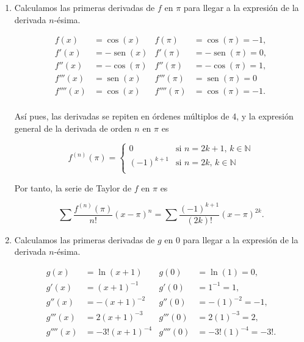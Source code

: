 \documentclass[
  spanish,
  a4paper,
]{scrreport}
\theoremstyle{definition}
\theoremstyle{remark}
\begin{document}
\begin{tcolorbox}[enhanced jigsaw, arc=.35mm, bottomrule=.15mm, bottomtitle=1mm, breakable, colback=white, colbacktitle=quarto-callout-tip-color!10!white, colframe=quarto-callout-tip-color-frame, coltitle=black, left=2mm, leftrule=.75mm, opacityback=0, opacitybacktitle=0.6, rightrule=.15mm, title=\textcolor{quarto-callout-tip-color}{\faLightbulb}\hspace{0.5em}{Solución}, titlerule=0mm, toprule=.15mm, toptitle=1mm]

\begin{enumerate}
\def\labelenumi{\alph{enumi}.}
\item
  Calculamos las primeras derivadas de \(f\) en \(\pi\) para llegar a la
  expresión de la derivada \(n\)-ésima.

  \begin{align*}
   f(x) &= \cos(x) & f(\pi) &= \cos(\pi) = -1, \\
   f'(x) &= -\operatorname{sen}(x) & f'(\pi) &= -\operatorname{sen}(\pi) = 0, \\
   f''(x) &= -\cos(\pi) & f''(\pi) &= -\cos(\pi) = 1, \\ 
   f'''(x) &= \operatorname{sen}(x) & f'''(\pi) &= \operatorname{sen}(\pi) = 0 \\
   f''''(x) &= \cos(x) & f''''(\pi) &= \cos(\pi) = -1. \\
   \end{align*}

  Así pues, las derivadas se repiten en órdenes múltiplos de 4, y la
  expresión general de la derivada de orden \(n\) en \(\pi\) es

  \[
   f^{(n)}(\pi) = 
   \begin{cases}
   0 & \mbox{si $n=2k+1$, $k\in\mathbb{N}$}\\
   (-1)^{k+1} & \mbox{si $n=2k$, $k\in\mathbb{N}$}\\
   \end{cases}
   \]

  Por tanto, la serie de Taylor de \(f\) en \(\pi\) es

  \[
   \sum \frac{f^{(n)}(\pi)}{n!}(x-\pi)^n = \sum \frac{(-1)^{k+1}}{(2k)!}(x-\pi)^{2k}.
   \]
\item
  Calculamos las primeras derivadas de \(g\) en \(0\) para llegar a la
  expresión de la derivada \(n\)-ésima.

  \begin{align*}
   g(x) &= \ln(x+1) & g(0) &= \ln(1) =0,\\
   g'(x) &= (x+1)^{-1} & g'(0) &= 1^{-1} = 1,\\
   g''(x) &= -(x+1)^{-2} & g''(0) &= -(1)^{-2} = -1,\\
   g'''(x) &= 2(x+1)^{-3} & g'''(0) &= 2(1)^{-3} = 2,\\
   g''''(x) &= -3!(x+1)^{-4} & g''''(0) &= -3!(1)^{-4} = -3!.\\
   \end{align*}


\end{enumerate}
\end{tcolorbox}
\end{document}
